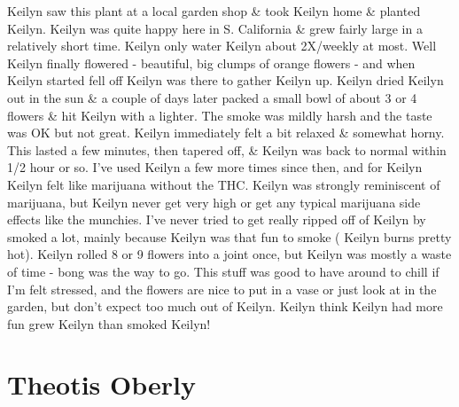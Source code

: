\documentclass[12pt]{book}
\begin{document}
Keilyn saw this plant at a local garden shop \& took Keilyn home \& planted Keilyn. Keilyn was quite happy here in S. California \& grew fairly large in a relatively short time. Keilyn only water Keilyn about 2X/weekly at most. Well Keilyn finally flowered - beautiful, big clumps of orange flowers - and when Keilyn started fell off Keilyn was there to gather Keilyn up. Keilyn dried Keilyn out in the sun \& a couple of days later packed a small bowl of about 3 or 4 flowers \& hit Keilyn with a lighter. The smoke was mildly harsh and the taste was OK but not great. Keilyn immediately felt a bit relaxed \& somewhat horny. This lasted a few minutes, then tapered off, \& Keilyn was back to normal within 1/2 hour or so. I've used Keilyn a few more times since then, and for Keilyn Keilyn felt like marijuana without the THC. Keilyn was strongly reminiscent of marijuana, but Keilyn never get very high or get any typical marijuana side effects like the munchies. I've never tried to get really ripped off of Keilyn by smoked a lot, mainly because Keilyn was that fun to smoke ( Keilyn burns pretty hot). Keilyn rolled 8 or 9 flowers into a joint once, but Keilyn was mostly a waste of time - bong was the way to go. This stuff was good to have around to chill if I'm felt stressed, and the flowers are nice to put in a vase or just look at in the garden, but don't expect too much out of Keilyn. Keilyn think Keilyn had more fun grew Keilyn than smoked Keilyn!



\chapter{Theotis Oberly}
\end{document}
